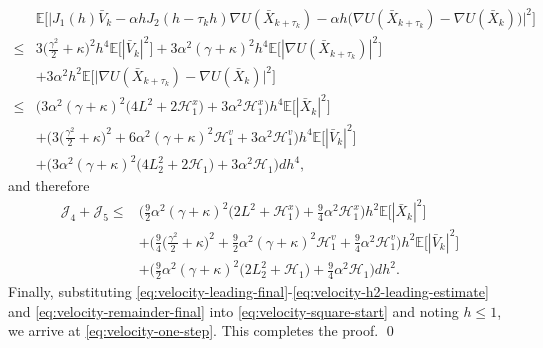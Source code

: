 \documentclass[12pt]{article}
\numberwithin{equation}{section}
\renewenvironment{proof}%
  {\begin{trivlist}%
   \item[]\ignorespaces}%
  {\qed\end{trivlist}}
\renewcommand{\H}{\mathcal{H}}
\begin{document}
\begin{proof}
\begin{equation}
\begin{aligned}
&\mathbb{E}
\Big[
\big|
J_1(h)\bar{V}_k
-
\alpha hJ_2(h-\tau_kh)
\nabla U(\bar{X}_{k+\tau_k})
-
\alpha h
\big(
\nabla U(\bar{X}_{k+\tau_k})
-
\nabla U(\bar{X}_k)
\big)
\big|^2
\Big]
\\
\leq&
3
\big(
\tfrac{\gamma^2}{2}
+
\kappa
\big)^2
h^4
\mathbb{E}
\Big[
|\bar{V}_k|^2
\Big]
+
3\alpha^2(\gamma+\kappa)^2h^4
\mathbb{E}
\Big[
|\nabla U(\bar{X}_{k+\tau_k})|^2
\Big]
\\  &
+
3\alpha^2h^2
\mathbb{E}
\Big[
\big|
\nabla U(\bar{X}_{k+\tau_k})
-
\nabla U(\bar{X}_k)
\big|^2
\Big]
\\
\leq&
\Big(
3\alpha^2(\gamma+\kappa)^2
\big(
4L^2+2\H_1^x
\big)
+
3\alpha^2\H_1^x
\Big)
h^4
\mathbb{E}
\Big[
|\bar{X}_k|^2
\Big]
\\
&+
\Big(
3
\big(
\tfrac{\gamma^2}{2}
+
\kappa
\big)^2
+
6\alpha^2(\gamma+\kappa)^2\H_1^v
+
3\alpha^2\H_1^v
\Big)
h^4
\mathbb{E}
\Big[
|\bar{V}_k|^2
\Big]
\\
&+
\Big(
3\alpha^2(\gamma+\kappa)^2
\big(
4L_2^2+2\H_1
\big)
+
3\alpha^2\H_1
\Big)dh^4,
\end{aligned}
\end{equation}
and therefore 
\begin{equation}
\label{eq:velocity-remainder-final}
\begin{aligned}
\mathcal J_4  + \mathcal J_5
\leq&
\Big(
\tfrac{9}{2}
\alpha^2(\gamma+\kappa)^2
\big(
2L^2+\H_1^x
\big)
+
\tfrac{9}{4}
\alpha^2\H_1^x
\Big)h^2
\mathbb{E}
\Big[
|\bar{X}_k|^2
\Big]
\\
&+
\Big(
\tfrac{9}{4}
\big(
\tfrac{\gamma^2}{2}
+
\kappa
\big)^2
+
\tfrac{9}{2}
\alpha^2(\gamma+\kappa)^2\H_1^v
+
\tfrac{9}{4}
\alpha^2\H_1^v
\Big)
h^2
\mathbb{E}
\Big[
|\bar{V}_k|^2
\Big]
\\
&+
\Big(
\tfrac{9}{2}
\alpha^2(\gamma+\kappa)^2
\big(
2L_2^2+\H_1
\big)
+
\tfrac{9}{4}
\alpha^2\H_1
\Big)
dh^2.
\end{aligned}
\end{equation}
Finally, substituting \eqref{eq:velocity-leading-final}-\eqref{eq:velocity-h2-leading-estimate} and \eqref{eq:velocity-remainder-final} into \eqref{eq:velocity-square-start} and noting $h\leq1$, we arrive at \eqref{eq:velocity-one-step}. This completes the proof.
\end{proof}

\end{document}
